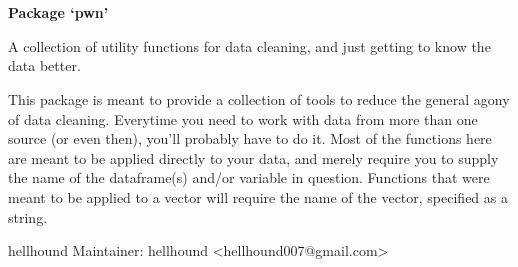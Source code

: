 \documentclass[letterpaper]{book}
\begin{document}
\chapter*{}
\begin{center}
{\textbf{\huge Package `pwn'}}
\par\bigskip{\large \today}
\end{center}
\begin{description}
\raggedright{}
\item[Type]
\item[Title]
\item[Version]
\item[Date]
\item[Author]
\item[Maintainer]\AsIs{}
\item[Description]
\item[License]
\end{description}
%
\begin{Description}\relax
A collection of utility functions for data cleaning, and just getting to know the data better. 
\end{Description}
%
\begin{Details}\relax

This package is meant to provide a collection of tools to reduce the general agony of data cleaning. 
Everytime you need to work with data from more than one source (or even then), you'll probably have to do it. 
Most of the functions here are meant to be applied directly to your data, and merely require you to supply the name of the dataframe(s) and/or variable in question. 
Functions that were meant to be applied to a vector will require the name of the vector, specified as a string. 
\end{Details}
%
\begin{Author}\relax
hellhound
Maintainer: hellhound <hellhound007@gmail.com>
\end{Author}
\end{document}
